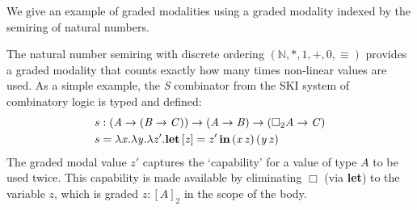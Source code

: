 We give an example of graded modalities using a graded modality indexed
by the semiring of natural numbers.

\begin{example}
\label{ex:s-comb}
  The natural number semiring with discrete ordering
  $(\mathbb{N}, \ast, 1, +, 0, \equiv)$ provides a graded modality
  that counts exactly how many times non-linear values are used. As a
  simple example, the \emph{S} combinator from the SKI system of combinatory logic is typed and defined:
\begin{align*}
s & : (  \mathit{A}  \rightarrow  (  \mathit{B}  \rightarrow  \mathit{C}  )  )  \rightarrow   (  \mathit{A}  \rightarrow  \mathit{B}  )  \rightarrow  (    \Box_{  2  }  \mathit{A}    \rightarrow  \mathit{C}  ) \\
s & = \lambda  \mathit{x}  .    \lambda  \mathit{y}  .    \lambda  \mathit{z'}  .    \textbf{let} \, [  \mathit{z}  ] =  \mathit{z'}  \, \textbf{in} \,   (  \mathit{x} \, \mathit{z}  ) \, (  \mathit{y} \, \mathit{z}  )
\end{align*}
The graded modal value $z'$ captures the `capability' for a value
of type $A$ to be used twice. This capability is made available by eliminating
$\Box$ (via \textbf{let}) to the variable $z$, which is
graded $z : [A]_2$ in the scope of the body.
\end{example}




